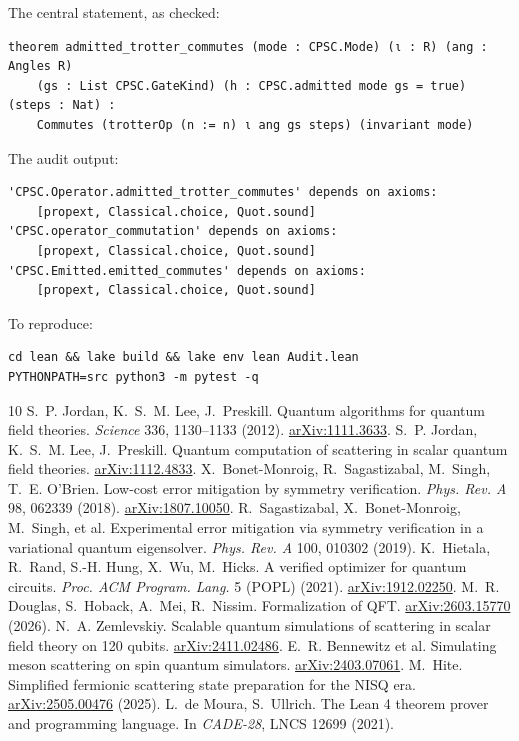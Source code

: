 \documentclass[11pt]{article}
\theoremstyle{definition}
\begin{document}
The central statement, as checked:
\begin{Verbatim}
theorem admitted_trotter_commutes (mode : CPSC.Mode) (ι : R) (ang : Angles R)
    (gs : List CPSC.GateKind) (h : CPSC.admitted mode gs = true) (steps : Nat) :
    Commutes (trotterOp (n := n) ι ang gs steps) (invariant mode)
\end{Verbatim}
The audit output:
\begin{Verbatim}
'CPSC.Operator.admitted_trotter_commutes' depends on axioms:
    [propext, Classical.choice, Quot.sound]
'CPSC.operator_commutation' depends on axioms:
    [propext, Classical.choice, Quot.sound]
'CPSC.Emitted.emitted_commutes' depends on axioms:
    [propext, Classical.choice, Quot.sound]
\end{Verbatim}
To reproduce:
\begin{Verbatim}
cd lean && lake build && lake env lean Audit.lean
PYTHONPATH=src python3 -m pytest -q
\end{Verbatim}

\begin{thebibliography}{10}
 S.~P. Jordan, K.~S.~M. Lee, J.~Preskill. Quantum algorithms for quantum field theories. \emph{Science} 336, 1130--1133 (2012). \href{https://arxiv.org/abs/1111.3633}{arXiv:1111.3633}.
 S.~P. Jordan, K.~S.~M. Lee, J.~Preskill. Quantum computation of scattering in scalar quantum field theories. \href{https://arxiv.org/abs/1112.4833}{arXiv:1112.4833}.
 X.~Bonet-Monroig, R.~Sagastizabal, M.~Singh, T.~E. O'Brien. Low-cost error mitigation by symmetry verification. \emph{Phys. Rev. A} 98, 062339 (2018). \href{https://arxiv.org/abs/1807.10050}{arXiv:1807.10050}.
 R.~Sagastizabal, X.~Bonet-Monroig, M.~Singh, et al. Experimental error mitigation via symmetry verification in a variational quantum eigensolver. \emph{Phys. Rev. A} 100, 010302 (2019).
 K.~Hietala, R.~Rand, S.-H. Hung, X.~Wu, M.~Hicks. A verified optimizer for quantum circuits. \emph{Proc. ACM Program. Lang.} 5 (POPL) (2021). \href{https://arxiv.org/abs/1912.02250}{arXiv:1912.02250}.
 M.~R. Douglas, S.~Hoback, A.~Mei, R.~Nissim. Formalization of QFT. \href{https://arxiv.org/abs/2603.15770}{arXiv:2603.15770} (2026).
 N.~A. Zemlevskiy. Scalable quantum simulations of scattering in scalar field theory on 120 qubits. \href{https://arxiv.org/abs/2411.02486}{arXiv:2411.02486}.
 E.~R. Bennewitz et al. Simulating meson scattering on spin quantum simulators. \href{https://arxiv.org/abs/2403.07061}{arXiv:2403.07061}.
 M.~Hite. Simplified fermionic scattering state preparation for the NISQ era. \href{https://arxiv.org/abs/2505.00476}{arXiv:2505.00476} (2025).
 L.~de Moura, S.~Ullrich. The Lean 4 theorem prover and programming language. In \emph{CADE-28}, LNCS 12699 (2021).
\end{thebibliography}
\end{document}
